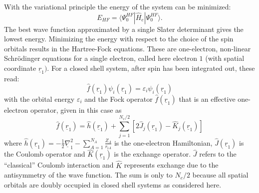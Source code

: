 \documentclass[11pt,DIV=13,BCOR=5mm,a4paper,headinclude]{scrbook}
\renewcommand{\vec}[1]{\underline{#1}}
\begin{document}
With the variational principle the energy of the system can be minimized:
\begin{equation}
E_{HF}=\langle\Psi^{HF}_0|\hat{H}_e|\Psi^{HF}_0\rangle.
\end{equation}
The best wave function approximated by a single Slater determinant gives the lowest energy. %
Minimizing the energy with respect to the choice of the spin orbitals results in the Hartree-Fock equations.
These are one-electron, non-linear Schrödinger equations for a single electron, called here electron $1$ (with spatial coordinate $\vec{r}_1)$.
For a closed shell system, after spin has been integrated out, these read:
\begin{equation}\label{eq:hf}
\hat{f}(\vec{r}_1)\psi_i(\vec{r}_1)=\varepsilon_i\psi_i(\vec{r}_1)
\end{equation}
with the orbital energy $\varepsilon_i$ and the Fock operator $\hat{f}(\vec{r}_1)$ that is an effective one-electron operator, given in this case as
\begin{equation}
 \hat{f}(\vec{r}_1) = \hat{h}(\vec{r}_1) + \sum_{j=1}^{N_e/2}[2\hat{J}_j(\vec{r}_1) - \hat{K}_j(\vec{r}_1)]
\end{equation}
where $\hat{h}(\vec{r}_1)=-\frac{1}{2}\vec{\nabla}_1^2 - \sum_{A=1}^{N_A}\frac{Z_A}{r_{iA}}$ is the one-electron Hamiltonian, $\hat{J}(\vec{r}_1)$ is the Coulomb operator and $\hat{K}(\vec{r}_1)$ is the exchange operator.
$\hat{J}$ refers to the ``classical'' Coulomb interaction and $\hat{K}$ represents exchange due to the antisymmetry of the wave function.
The sum is only to $N_e/2$ because all spatial orbitals are doubly occupied in closed shell systems as considered here.
\end{document}
